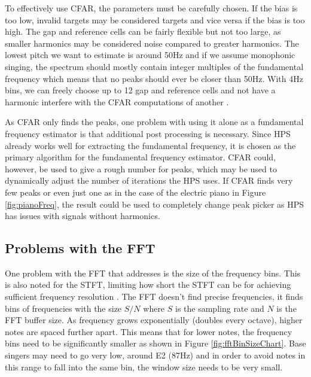 To effectively use CFAR, the parameters must be carefully chosen. If the bias is too low, invalid targets may be considered targets and vice versa if the bias is too high. The gap and reference cells can be fairly flexible but not too large, as smaller harmonics may be considered noise compared to greater harmonics. The lowest pitch we want to estimate is around 50Hz and if we assume monophonic singing, the spectrum should mostly contain integer multiples of the fundamental frequency which means that no peaks should ever be closer than 50Hz. With 4Hz bins, we can freely choose up to 12 gap and reference cells and not have a harmonic interfere with the CFAR computations of another \cite{Bruner2024}.  

As CFAR only finds the peaks, one problem with using it alone as a fundamental frequency estimator is that additional post processing is necessary. Since HPS already works well for extracting the fundamental frequency, it is chosen as the primary algorithm for the fundamental frequency estimator. CFAR could, however, be used to give a rough number for peaks, which may be used to dynamically adjust the number of iterations the HPS uses. If CFAR finds very few peaks or even just one as in the case of the electric piano in Figure \ref{fig:pianoFreq}, the result could be used to completely change peak picker as HPS has issues with signals without harmonics.

\subsection{Problems with the FFT}
One problem with the FFT that \cite{Gotsopoulos} addresses is the size of the frequency bins. This is also noted for the STFT, limiting how short the STFT can be for achieving sufficient frequency resolution \cite{Evans2012}. The FFT doesn't find precise frequencies, it finds bins of frequencies with the size $S/N$ where $S$ is the sampling rate and $N$ is the FFT buffer size. As frequency grows exponentially (doubles every octave), higher notes are spaced further apart. This means that for lower notes, the frequency bins need to be significantly smaller as shown in Figure \ref{fig:fftBinSizeChart}. Base singers may need to go very low, around E2 (87Hz) and in order to avoid notes in this range to fall into the same bin, the window size needs to be very small.  

